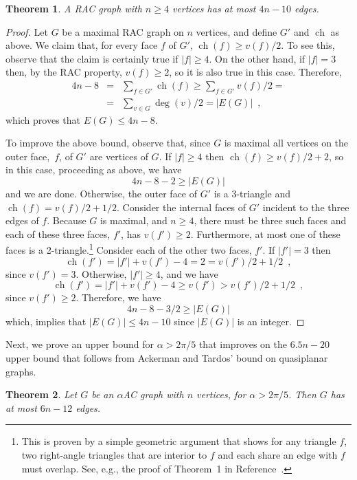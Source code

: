 \documentclass{patmorin}
\DeclareMathOperator{\ch}{ch}
\newtheorem{thm}{Theorem}
\begin{document}
\begin{thm}
A RAC graph with $n \ge 4$ vertices has at most $4n-10$ edges.
\end{thm}
\begin{proof}
Let $G$ be a maximal RAC graph on $n$ vertices, and define $G'$ and $\ch$
as above.  We claim that, for every face $f$ of $G'$, $\ch(f)\ge v(f)/2$.
To see this, observe that the claim is certainly true if $|f| \ge 4$.  On
the other hand, if $|f|=3$ then, by the RAC property, $v(f) \ge 2$, so it
is also true in this case.
Therefore,
\begin{eqnarray*}
4n-8    & =  &  \sum_{f\in G'} \ch(f)  \ge  \sum_{f\in G'} v(f)/2 = \\
        & = &  \sum_{v\in G} \deg(v)/2  =  |E(G)| \enspace ,
\end{eqnarray*}
which proves that $E(G)\le 4n-8$.

To improve the above bound, observe that, since $G$ is maximal all vertices
on the outer face,~$f$, of $G'$ are vertices of $G$.  If $|f| \ge 4$ then
$\ch(f) \ge v(f)/2 + 2$, so in this case, proceeding as above, we have
\[
    4n-8-2 \ge |E(G)|
\]
and we are done.  Otherwise, the outer face of $G'$ is a 3-triangle and
$\ch(f) = v(f)/2 + 1/2$.
Consider the internal faces of $G'$ incident to the three edges of $f$.
Because $G$ is maximal, and $n\ge 4$, there must
be three such faces and each of these three faces, $f'$, has $v(f') \ge 2$.
Furthermore, at most one of these faces is a 2-triangle.\footnote{This is proven by a simple geometric argument that shows for
any triangle $f$, two right-angle triangles that are interior to $f$
and each share an edge with $f$ must overlap. See, e.g., the proof of
Theorem~1 in Reference~\cite{del-dgrac-09}.}
Consider each of the other two faces, $f'$.  If $|f'|=3$ then
\[
   \ch(f') = |f'| + v(f') - 4 = 2 = v(f')/2 + 1/2 \enspace ,
\]
since $v(f')=3$.
Otherwise, $|f'|\ge 4$, and we have 
\[
   \ch(f') = |f'| + v(f') - 4 \ge v(f') > v(f')/2 + 1/2 \enspace ,
\]
since $v(f')\ge 2$.
Therefore, we have
\[
    4n-8-3/2 \ge |E(G)|
\]
which, implies that $|E(G)| \le 4n-10$ since $|E(G)|$ is an integer.
\end{proof}

Next, we prove an upper bound for $\alpha > 2\pi/5$ that improves on the
$6.5n-20$ upper bound that follows from Ackerman and Tardos' bound on
quasiplanar graphs.

\begin{thm}\label{thm:six-n}
Let $G$ be an $\alpha$AC graph with $n$ vertices, for $\alpha > 2\pi/5$.
Then $G$ has at most $6n-12$ edges.
\end{thm}
\end{document}
